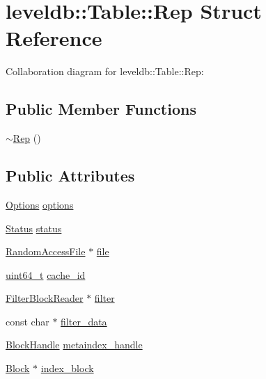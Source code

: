 \hypertarget{structleveldb_1_1_table_1_1_rep}{\section{leveldb\-:\-:Table\-:\-:Rep Struct Reference}
\label{structleveldb_1_1_table_1_1_rep}
}


Collaboration diagram for leveldb\-:\-:Table\-:\-:Rep\-:
\subsection*{Public Member Functions}
\begin{DoxyCompactItemize}
\item 
\hyperlink{structleveldb_1_1_table_1_1_rep_a589eccb49554eb53054c95f5e6b5aac3}{$\sim$\-Rep} ()
\end{DoxyCompactItemize}
\subsection*{Public Attributes}
\begin{DoxyCompactItemize}
\item 
\hyperlink{structleveldb_1_1_options}{Options} \hyperlink{structleveldb_1_1_table_1_1_rep_a96ff2b389369e1b0706b090961065740}{options}
\item 
\hyperlink{classleveldb_1_1_status}{Status} \hyperlink{structleveldb_1_1_table_1_1_rep_aceaddad6024db9f34af2358503e4c089}{status}
\item 
\hyperlink{classleveldb_1_1_random_access_file}{Random\-Access\-File} $\ast$ \hyperlink{structleveldb_1_1_table_1_1_rep_a5b96b0d545bb3dbe2bccdefab1a83092}{file}
\item 
\hyperlink{stdint_8h_aaa5d1cd013383c889537491c3cfd9aad}{uint64\-\_\-t} \hyperlink{structleveldb_1_1_table_1_1_rep_af5beb2186a60560f5381271ad53420b8}{cache\-\_\-id}
\item 
\hyperlink{classleveldb_1_1_filter_block_reader}{Filter\-Block\-Reader} $\ast$ \hyperlink{structleveldb_1_1_table_1_1_rep_a35acf83732a3dea3df5869cb05c1cb5f}{filter}
\item 
const char $\ast$ \hyperlink{structleveldb_1_1_table_1_1_rep_a2dd458aa96c0a357414f13354810cea9}{filter\-\_\-data}
\item 
\hyperlink{classleveldb_1_1_block_handle}{Block\-Handle} \hyperlink{structleveldb_1_1_table_1_1_rep_a11500653a2db8ba301bca5027a508789}{metaindex\-\_\-handle}
\item 
\hyperlink{classleveldb_1_1_block}{Block} $\ast$ \hyperlink{structleveldb_1_1_table_1_1_rep_ae69d991c9b8ec7330b22acc06a932fe8}{index\-\_\-block}
\end{DoxyCompactItemize}


